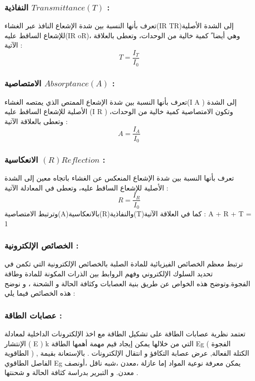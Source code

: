 \subsubsection*{النفاذية $ Transmittance(T)  $ :  }
		 تعرف بأنها النسبة بين شدة الإشعاع النافذ عبر الغشاء(IR TR)إلى الشدة الأصلية للإشعاع الساقط عليه(IR oR)، وهي أيضا ً كمية خالية من الوحدات، وتعطى بالعلاقة الآتية :  \begin{equation*} 	T = \dfrac{I_{T} }{I_{0}}\end{equation*}
		
		\subsubsection*{الامتصاصية $ Absorptance (A) $ : }
		 تعرف بأنها النسبة بين شدة الإشعاع الممتص الذي يمتصه الغشاء(I A ) إلى الشدة الأصلية للإشعاع الساقط عليه (I R ) وتكون الامتصاصية كمية خالية من الوحدات، وتعطى بالعلاقة الآتية : \begin{equation*} 	A = \dfrac{I_{A} }{I_{0}}\end{equation*}
		
				\subsubsection*{الانعكاسية $ (R) Reflection $ :} 
		 تعرف بأنها النسبة بين شدة الإشعاع المنعكس عن الغشاء باتجاه معين إلى الشدة الأصلية للإشعاع الساقط عليه، وتعطى في المعادلة الآتية : \begin{equation*} 	R = \dfrac{I_{R} }{I_{0}}\end{equation*}
		وترتبط الامتصاصية(A)بالانعكاسية(R)والنفاذية(T)كما في العلاقة الآتية : A + R + T = 1
	
	\subsubsection{الخصائص الإلكترونية : }
	
	 ترتبط معظم الخصائص الفيزيائية للمادة الصلبة بالخصائص الإلكترونية التي تكمن في تحديد السلوك الإلكتروني وفهم الروابط بين الذرات المكونة للمادة وطاقة الفجوة.وتوضح هذه الخواص عن طريق بنية العصابات وكثافة الحالة و الشحنة ، و نوضح هذه الخصائص فيما يلي :
	
			\subsubsection*{عصابات الطاقة :}
		 تعتمد نظرية عصابات الطاقة على تشكيل الطاقة مع اخذ الإلكترونات الداخلية لمعادلة الإنتشار ( E ) k التي من خلالها يمكن إيجاد قيم مهمة أهمها الطاقة Eg ( الفجوة الطاقوية ) , الكتلة الفعالة, عرض عصابة التكافؤ و انتقال الإلكترونات . 
		بالإستعانة بقيمة الفاصل الطاقوي Eg يمكن معرفة نوعية المواد إما عازلة ،معدن ،شبه ناقل ،أونصف معدن. و التبرير بدراسة كثافة الحالة و شحنتها .\\
		
